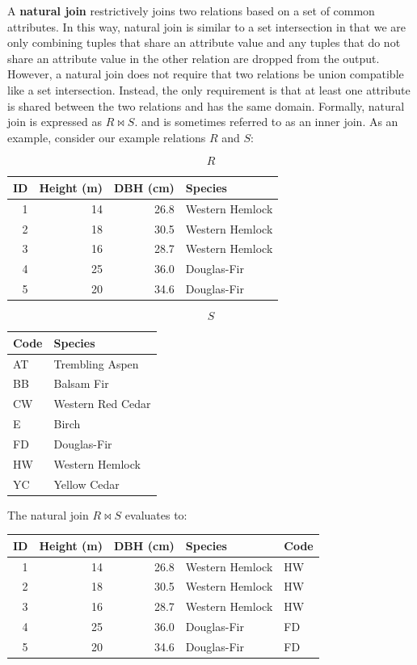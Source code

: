 \documentclass[
]{book}
\begin{document}
A \textbf{natural join} restrictively joins two relations based on a set of common attributes. In this way, natural join is similar to a set intersection in that we are only combining tuples that share an attribute value and any tuples that do not share an attribute value in the other relation are dropped from the output. However, a natural join does not require that two relations be union compatible like a set intersection. Instead, the only requirement is that at least one attribute is shared between the two relations and has the same domain. Formally, natural join is expressed as \(R⋈S\). and is sometimes referred to as an inner join. As an example, consider our example relations \(R\) and \(S\):

\[R\]

\begin{tabular}{rrrl}
\toprule
ID & Height (m) & DBH (cm) & Species\\
\midrule
1 & 14 & 26.8 & Western Hemlock\\
2 & 18 & 30.5 & Western Hemlock\\
3 & 16 & 28.7 & Western Hemlock\\
4 & 25 & 36.0 & Douglas-Fir\\
5 & 20 & 34.6 & Douglas-Fir\\
\bottomrule
\end{tabular}

\[S\]

\begin{tabular}{ll}
\toprule
Code & Species\\
\midrule
AT & Trembling Aspen\\
BB & Balsam Fir\\
CW & Western Red Cedar\\
E & Birch\\
FD & Douglas-Fir\\
\addlinespace
HW & Western Hemlock\\
YC & Yellow Cedar\\
\bottomrule
\end{tabular}

The natural join \(R⋈S\) evaluates to:

\begin{tabular}{rrrll}
\toprule
ID & Height (m) & DBH (cm) & Species & Code\\
\midrule
1 & 14 & 26.8 & Western Hemlock & HW\\
2 & 18 & 30.5 & Western Hemlock & HW\\
3 & 16 & 28.7 & Western Hemlock & HW\\
4 & 25 & 36.0 & Douglas-Fir & FD\\
5 & 20 & 34.6 & Douglas-Fir & FD\\
\bottomrule
\end{tabular}
\end{document}
